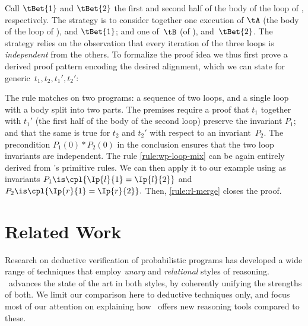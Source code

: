 \documentclass[acmsmall,nonacm,screen,appendix]{acmart}
\begin{document}
Call $\tBet{1}$ and $\tBet{2}$ the first and second half of the body of the loop
of , respectively.
The strategy
is to consider together one execution of $\tA$
(the body of the loop of ),
and $\tBet{1}$;
and one of~$\tB$ (of ),
and~$\tBet{2}$.
The strategy relies on the observation that every iteration of the three loops
is \emph{independent} from the others.
To formalize the proof idea we thus first prove a derived proof pattern
encoding the desired alignment, which we can state for generic~$t_1,t_2,t_1',t_2'$:
\begin{proofrule}
     \label{rule:wp-loop-mix}
\end{proofrule}
The rule matches on two programs: a sequence of two loops,
and a single loop with a body split into two parts.
The premises require a proof that $t_1$ together with $t_1'$ (the first half of the body of the second loop) preserve the invariant $P_1$;
and that the same is true for $t_2$ and $t_2'$ with respect to an invariant~$P_2$.
The precondition $P_1(0)*P_2(0)$ in the conclusion ensures that the two
loop invariants are independent.
The rule \ref{rule:wp-loop-mix} can be again entirely derived
from \thelogic's primitive rules.
We can then apply it to our example
using as invariants
$
  P_1 \is \cpl{\Ip{l}{1} = \Ip{l}{2}}
$ and $
  P_2 \is \cpl{\Ip{r}{1} = \Ip{r}{2}}.
$
Then, \ref{rule:rl-merge} closes the proof.

\endgroup 



 \section{Related Work}
\label{sec:relwork}





Research on deductive verification of probabilistic programs has developed a
wide range of techniques that employ {\em unary} and  {\em relational} styles of reasoning. \thelogic\ advances the state of the art in both styles, by coherently unifying the strengths of both. We limit our comparison here to deductive techniques only, and focus most of our attention on explaining how \thelogic\ offers new  reasoning tools compared to these.
\end{document}
